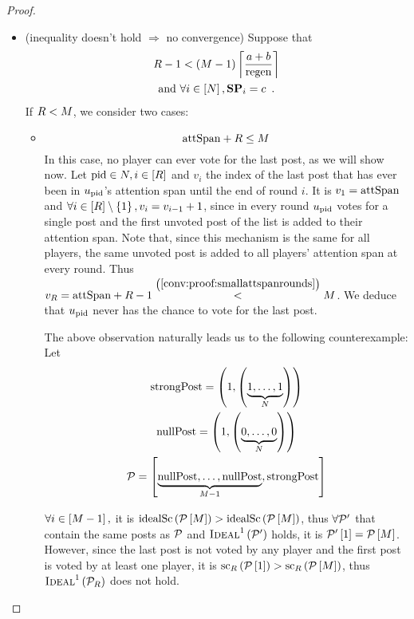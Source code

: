 \begin{proof}
\begin{itemize}
    \item (inequality doesn't hold $\Rightarrow$ no convergence) Suppose that
    \begin{gather}
      \label{conv:proof:fewrounds}
      \rounds - 1 < \left(\postlen - 1\right)\ceil*{\frac{a+b}{\regen}} \\
      \text{and } \forall i \in \left[\playerlen\right], \stpowvec_i = c
      \enspace. \nonumber
    \end{gather}
    If $R < M$, we consider two cases:
    \begin{itemize}
      \item \begin{equation}
        \label{conv:proof:smallattspanrounds}
        \attspan + \rounds \leq \postlen
      \end{equation}
      In this case, no player can ever vote for the last post, as we will show
      now. Let $\mathrm{pid} \in N, i \in \left[R\right]$ and $v_i$ the
      index of the last post that has ever been in $u_{\mathrm{pid}}$'s attention
      span until the end of round $i$. It is $v_1 = \mathrm{attSpan}$ and $\forall
      i \in \left[R\right] \setminus \left\{1\right\}, v_i = v_{i - 1} +
      1$, since in every round $u_{\mathrm{pid}}$ votes for a single post and the
      first unvoted post of the list is added to their attention span. Note
      that, since this mechanism is the same for all players, the same unvoted
      post is added to all players' attention span at every round. Thus
      $v_R = \mathrm{attSpan} + R - 1
      \overset{\left(\ref{conv:proof:smallattspanrounds}\right)}{<} M$.
      We deduce that $u_{\mathrm{pid}}$ never has the chance to vote for the last
      post.

      The above observation naturally leads us to the following counterexample:
      Let
      \begin{gather*}
        \mathrm{strongPost} = \left(1, \left(\underbrace{1, \dots,
        1}_{N}\right)\right) \\
        \mathrm{nullPost} = \left(1, \left(\underbrace{0, \dots,
        0}_{N}\right)\right) \\
        \mathcal{P} = \left[\underbrace{\mathrm{nullPost}, \dots, \mathrm{nullPost}}_{M -
        1}, \mathrm{strongPost}\right]
      \end{gather*}

      $\forall i \in \left[M - 1\right],$ it is
      $\mathrm{idealSc}\left(\mathcal{P}\left[M\right]\right) >
      \mathrm{idealSc}\left(\mathcal{P}\left[M\right]\right)$, thus $\forall \mathcal{P}'$ that
      contain the same posts as $\mathcal{P}$ and
      $\textsc{Ideal}^1\left(\mathcal{P}'\right)$ holds, it is
      $\mathcal{P}'\left[1\right] = \mathcal{P}\left[M\right]$. However,
      since the last post is not voted by any player and the first post is voted
      by at least one player, it is
      $\mathrm{sc}_R\left(\mathcal{P}\left[1\right]\right) >
      \mathrm{sc}_R\left(\mathcal{P}\left[M\right]\right)$, thus
      $\textsc{Ideal}^1\left(\mathcal{P}_R\right)$ does not hold.


\end{itemize}
\end{itemize}
\end{proof}
